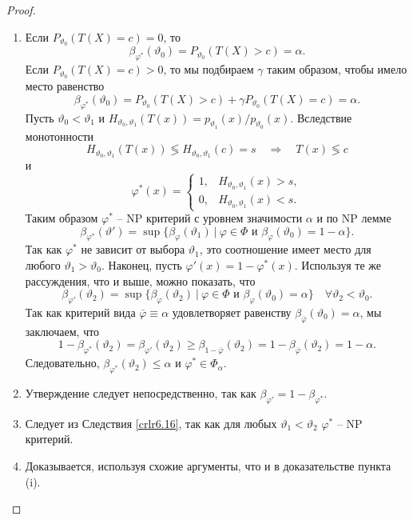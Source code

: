 \begin{proof} \
	\begin{enumerate}
		\item Если $P_{\vartheta_0}(T(X) = c) = 0$, то
		\[\beta_{\varphi^*}(\vartheta_0) = P_{\vartheta_0}(T(X) > c) = \alpha.  \]
		Если $P_{\vartheta_0}(T(X) = c) > 0$, то мы подбираем $\gamma$ таким образом, чтобы имело место равенство
		\[\beta_{\varphi^*}(\vartheta_0)=P_{\vartheta_0}(T(X)>c) + \gamma P_{\vartheta_0}(T(X) = c) = \alpha. \]
		Пусть $\vartheta_0 < \vartheta_1$ и $H_{\vartheta_0, \vartheta_1}(T(x)) = p_{\vartheta_1}(x) / p_{\vartheta_0}(x)$. Вследствие монотонности
		\[ H_{\vartheta_0, \vartheta_1}(T(x)) \lessgtr H_{\vartheta_0, \vartheta_1}(c) = s \quad \Longrightarrow \quad T(x) \lessgtr c \]
		и
		\[ \varphi^*(x) =
		\left \{
		\begin{array}{cl}
		1, & H_{\vartheta_0, \vartheta_1}(x) > s, \\
		0, & H_{\vartheta_0, \vartheta_1}(x) < s.
		\end{array}
		\right.
	    \]
	    Таким образом $\varphi^*$ -- NP критерий с уровнем значимости $\alpha$ и по NP лемме
	    \[ \beta_{\varphi^*}(\vartheta') = \sup \{\beta_\varphi(\vartheta_1)\ |\ \varphi \in \Phi \text{ и } \beta_\varphi(\vartheta_0) = 1-\alpha \}. \]
	    Так как $\varphi^*$ не зависит от выбора $\vartheta_1$, это соотношение имеет место для любого $\vartheta_1 > \vartheta_0$. Наконец, пусть $\varphi'(x) = 1 - \varphi^*(x)$. Используя те же рассуждения, что и выше, можно показать, что
	    \[ \beta_{\varphi'}(\vartheta_2) = \sup \{\beta_\varphi(\vartheta_2)\ |\ \varphi \in \Phi \text{ и } \beta_\varphi(\vartheta_0) = \alpha \} \quad \forall \vartheta_2 < \vartheta_0. \]
	    Так как критерий вида $\overline{\varphi} \equiv \alpha$ удовлетворяет равенству $\beta_{\overline{\varphi}}(\vartheta_0) = \alpha$, мы заключаем, что
	    \[1 - \beta_{\varphi^*}(\vartheta_2) = \beta_{\varphi'}(\vartheta_2) \geq \beta_{1-\overline{\varphi}}(\vartheta_2) = 1 -\beta_{\overline{\varphi}}(\vartheta_2) = 1 - \alpha.   \]
	    Следовательно, $\beta_{\varphi^*}(\vartheta_2) \leq \alpha$ и $\varphi^* \in \Phi_\alpha$.
		\item Утверждение следует непосредственно, так как $\beta_{\varphi'} = 1 - \beta_{\varphi^*}$.
		\item Следует из Следствия \ref{crlr6.16}, так как для любых $\vartheta_1 < \vartheta_2$ $\varphi^*$ -- NP критерий.
		\item Доказывается, используя схожие аргументы, что и в доказательстве пункта (i).
	\end{enumerate}
\end{proof}

